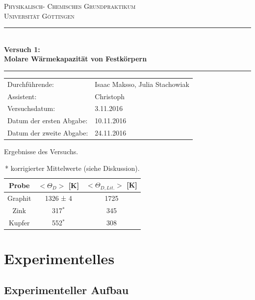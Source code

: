 \documentclass[12pt,a4paper,titlepage,headinclude,bibtotoc]{scrartcl}
\begin{document}
\begin{titlepage}
\centering
\textsc{\Large Physikalisch- Chemisches Grundpraktikum\\[1.5ex] Universität Göttingen}

\vspace*{0.5cm}

\rule{\textwidth}{1pt}\\[0.5cm]
{\huge \bfseries
  Versuch 1: \\[1.5ex]
  Molare Wärmekapazität von Festkörpern }\\[0.5cm]
\rule{\textwidth}{1pt}

\vspace*{0.5cm}


\begin{Large}
\begin{tabular}{ll}
Durchführende: &  Isaac Maksso, Julia Stachowiak\\
Assistent: & Christoph \\
 Versuchsdatum: & 3.11.2016\\
 Datum der ersten Abgabe: & 10.11.2016\\
 Datum der zweite Abgabe: & 24.11.2016\\
\end{tabular}
\end{Large}

\vspace*{0.5cm}


\begin{table}[h!]
\centering
\caption{Ergebnisse des Versuchs.}
\begin{tabular}{c|c|c}
Probe& $<\Theta_D >$ [K]& $<\Theta_{D,Lit.}>$ [K] \\
\hline
Graphit &1326 ± 4 & 1725\\
\hline
Zink & 317$^*$ & 345\\
\hline
Kupfer & 552$^*$ &308\\
\end{tabular}
\caption*{* korrigierter Mittelwerte (siehe Diskussion).}
\end{table}

\end{titlepage}


\tableofcontents

\newpage


\section{Experimentelles}
\subsection{Experimenteller Aufbau}
\end{document}
